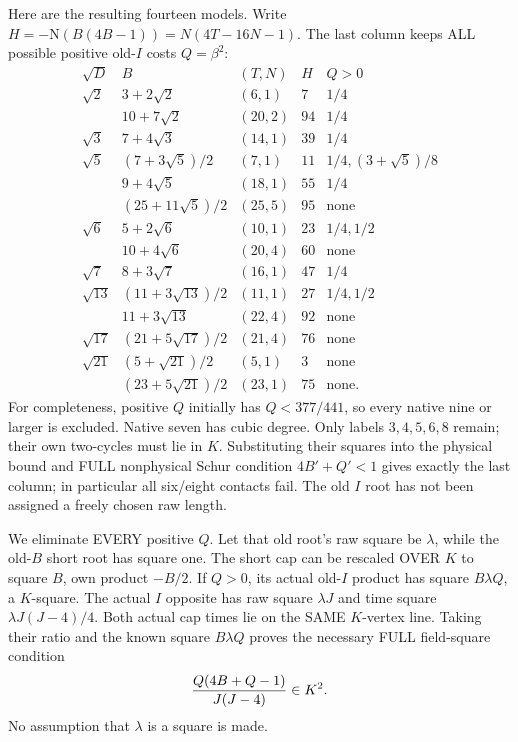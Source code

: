 Here are the resulting fourteen models.
Write \(H=-\mathrm N(B(4B-1))
=N(4T-16N-1)\).
The last column keeps ALL possible
positive old-\(I\) costs \(Q=\beta^2\):
\[
\begin{array}{c|c|c|r|l}
 \sqrt D&B&(T,N)&H&Q>0\\ \hline
 \sqrt2&3+2\sqrt2&(6,1)&7&1/4\\
 &10+7\sqrt2&(20,2)&94&1/4\\
 \sqrt3&7+4\sqrt3&(14,1)&39&1/4\\
 \sqrt5&(7+3\sqrt5)/2&(7,1)&11&1/4,(3+\sqrt5)/8\\
 &9+4\sqrt5&(18,1)&55&1/4\\
 &(25+11\sqrt5)/2&(25,5)&95&\text{none}\\
 \sqrt6&5+2\sqrt6&(10,1)&23&1/4,1/2\\
 &10+4\sqrt6&(20,4)&60&\text{none}\\
 \sqrt7&8+3\sqrt7&(16,1)&47&1/4\\
 \sqrt{13}&(11+3\sqrt{13})/2&(11,1)&27&1/4,1/2\\
 &11+3\sqrt{13}&(22,4)&92&\text{none}\\
 \sqrt{17}&(21+5\sqrt{17})/2&(21,4)&76&\text{none}\\
 \sqrt{21}&(5+\sqrt{21})/2&(5,1)&3&\text{none}\\
 &(23+5\sqrt{21})/2&(23,1)&75&\text{none}.
\end{array}
\]
For completeness, positive \(Q\) initially
has \(Q<377/441\), so every native nine
or larger is excluded.
Native seven has cubic degree.
Only labels \(3,4,5,6,8\) remain;
their own two-cycles must lie in \(K\).
Substituting their squares into the
physical bound and FULL nonphysical
Schur condition \(4B'+Q'<1\) gives
exactly the last column; in particular
all six/eight contacts fail.
The old \(I\) root has not been assigned
a freely chosen raw length.

We eliminate EVERY positive \(Q\).
Let that old root's raw square be
\(\lambda\), while the old-\(B\) short
root has square one.
The short cap can be rescaled OVER \(K\)
to square \(B\), own product \(-B/2\).
If \(Q>0\), its actual old-\(I\) product
has square \(B\lambda Q\), a \(K\)-square.
The actual \(I\) opposite has raw square
\(\lambda J\) and time square
\(\lambda J(J-4)/4\).
Both actual cap times lie on the SAME
\(K\)-vertex line.
Taking their ratio and the known square
\(B\lambda Q\) proves the necessary
FULL field-square condition
\[
                          {Q(4B+Q-1)\over J(J-4)}\in K^2 .
\]
No assumption that \(\lambda\) is a
square is made.

